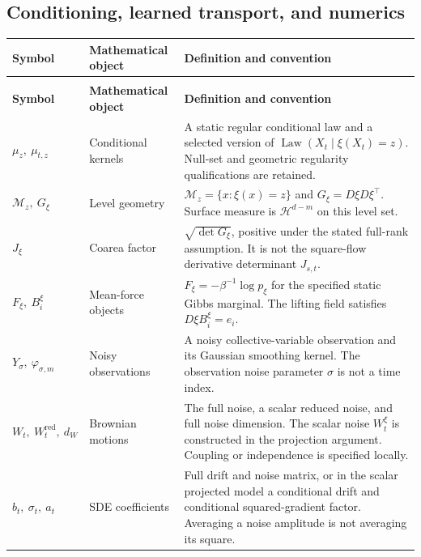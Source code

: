 \subsection*{Conditioning, learned transport, and numerics}
\begingroup
\small
{}
\setlength{\tabcolsep}{4pt}
\renewcommand{\arraystretch}{1.16}
\begin{longtable}{@{}>{\raggedright\arraybackslash}p{32mm}>{\raggedright\arraybackslash}p{26mm}>{\raggedright\arraybackslash}p{90mm}@{}}
\toprule
\textbf{Symbol} & \textbf{Mathematical object} & \textbf{Definition and convention}\\
\midrule
\endfirsthead
\multicolumn{3}{@{}l}{\small\itshape Conditioning, learned transport, and numerics (continued)}\\[3pt]
\toprule
\textbf{Symbol} & \textbf{Mathematical object} & \textbf{Definition and convention}\\
\midrule
\endhead
\bottomrule
\endfoot
$\mu_z,\ \mu_{t,z}$ & Conditional kernels & A static regular conditional law and a selected version of $\operatorname{Law}(X_t\mid\xi(X_t)=z)$. Null-set and geometric regularity qualifications are retained.\\[3pt]
$\mathcal M_z,\ G_\xi$ & Level geometry & $\mathcal M_z=\{x:\xi(x)=z\}$ and $G_\xi=D\xi D\xi^\top$. Surface measure is $\mathcal H^{d-m}$ on this level set.\\[3pt]
$J_\xi$ & Coarea factor & $\sqrt{\det G_\xi}$, positive under the stated full-rank assumption. It is not the square-flow derivative determinant $J_{s,t}$.\\[3pt]
$F_\xi,\ B_i^\xi$ & Mean-force objects & $F_\xi=-\beta^{-1}\log p_\xi$ for the specified static Gibbs marginal. The lifting field satisfies $D\xi B_i^\xi=e_i$.\\[3pt]
$Y_\sigma,\ \varphi_{\sigma,m}$ & Noisy observations & A noisy collective-variable observation and its Gaussian smoothing kernel. The observation noise parameter $\sigma$ is not a time index.\\[3pt]
$W_t,\ W_t^{\mathrm{red}},\ d_W$ & Brownian motions & The full noise, a scalar reduced noise, and full noise dimension. The scalar noise $W_t^\xi$ is constructed in the projection argument. Coupling or independence is specified locally.\\[3pt]
$b_t,\ \sigma_t,\ a_t$ & SDE coefficients & Full drift and noise matrix, or in the scalar projected model a conditional drift and conditional squared-gradient factor. Averaging a noise amplitude is not averaging its square.\\[3pt]

\end{longtable}
